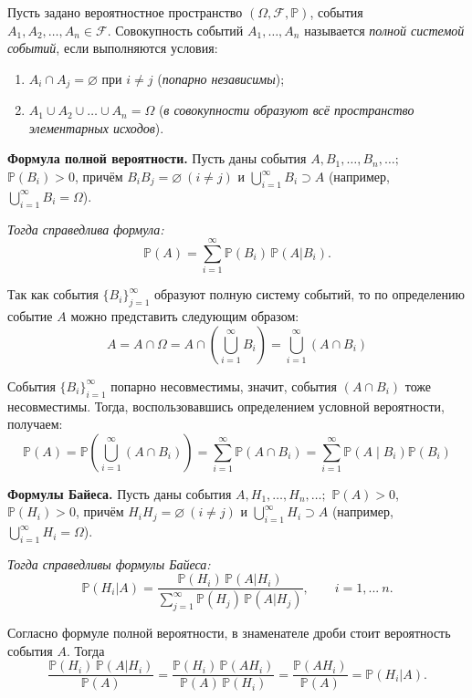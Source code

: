 \Def Пусть задано вероятностное пространство $(\Omega, \mathcal{F}, \mathbb{P})$, события $A_1, A_2, \ldots, A_n \in \mathcal{F}$. Совокупность событий $A_1, \ldots, A_n$ называется \textit{полной системой событий}, если выполняются условия:
\begin{enumerate}
    \item $A_i \cap A_j = \varnothing$ \quad при $i \ne j$\; (\textit{попарно независимы});
    \item $A_1 \cup A_2 \cup \ldots \cup A_n = \Omega$\; (\textit{в совокупности образуют всё пространство элементарных исходов}).
\end{enumerate}


\textbf{Формула полной вероятности.} Пусть даны события $A, B_1, \ldots, B_n, \ldots;$ $\mathbb{P}(B_i) > 0$, причём $B_i B_j = \varnothing~(i \ne j)$ и $\bigcup\limits_{i=1}^\infty B_i \supset A$ (например, $\bigcup\limits_{i=1}^\infty B_i = \Omega$). 

\textit{Тогда справедлива формула:}
\[
\mathbb{P}(A) = \sum\limits_{i=1}^\infty \mathbb{P}(B_i)\, \mathbb{P}(A|B_i).
\]

\Proof

Так как события $\{B_i\}_{j=1}^\infty$ образуют полную систему событий, то по определению событие $A$ можно представить следующим образом:
\[
A = A \cap \Omega = A \cap \left(\bigcup_{i=1}^{\infty} B_i\right) = \bigcup_{i=1}^{\infty}(A \cap B_i)
\]

События $\{B_i\}_{i=1}^{\infty}$ попарно несовместимы, значит, события $(A \cap B_i)$ тоже несовместимы. Тогда, воспользовавшись определением условной вероятности, получаем:
\[
\mathbb{P}(A) = \mathbb{P}\left(\bigcup_{i=1}^{\infty}(A \cap B_i)\right) = \sum_{i=1}^{\infty} \mathbb{P}(A \cap B_i) = \sum_{i=1}^{\infty} \mathbb{P}(A \mid B_i)\mathbb{P}(B_i)
\]

\Endproof


\textbf{Формулы Байеса.} Пусть даны события $A, H_1, \ldots, H_n, \ldots;$ $\mathbb{P}(A) > 0$, $\mathbb{P}(H_i) > 0$, причём $H_i H_j = \varnothing~(i \ne j)$ и $\bigcup\limits_{i=1}^\infty H_i \supset A$ (например, $\bigcup\limits_{i=1}^\infty H_i = \Omega$).

\textit{Тогда справедливы формулы Байеса:}
\[
\mathbb{P}(H_i|A) = \frac{\mathbb{P}(H_i)\, \mathbb{P}(A|H_i)}
{\sum\limits_{j=1}^\infty \mathbb{P}(H_j)\, \mathbb{P}(A|H_j)}, \qquad i = 1, ... \ n.
\]

\Proof

Согласно формуле полной вероятности, в знаменателе дроби стоит вероятность события $A$. Тогда
\[
\frac{\mathbb{P}(H_i)\, \mathbb{P}(A|H_i)}{\mathbb{P}(A)}
= \frac{\mathbb{P}(H_i)\, \mathbb{P}(A H_i)}{\mathbb{P}(A)\, \mathbb{P}(H_i)}
= \frac{\mathbb{P}(A H_i)}{\mathbb{P}(A)}
= \mathbb{P}(H_i|A).
\]

\Endproof